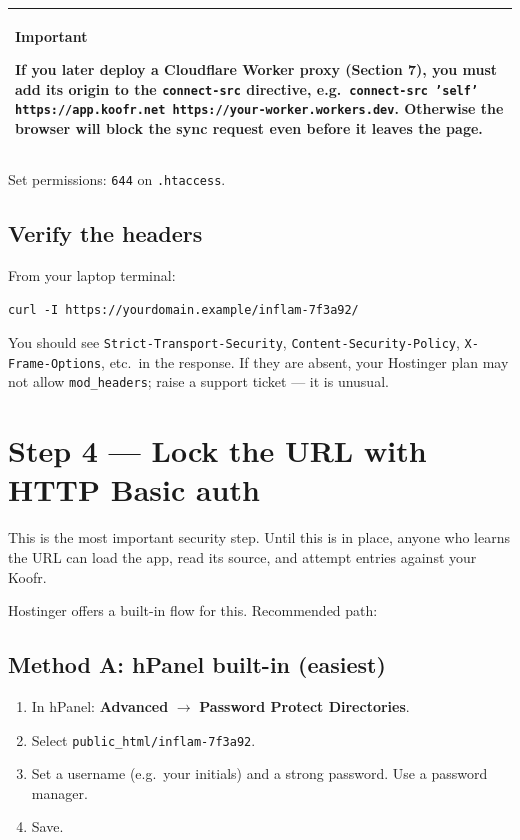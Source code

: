 \documentclass[11pt,a4paper]{article}
\newcommand{\callout}[3]{%
  \begin{center}%
  \begin{tabularx}{\linewidth}{|>{\columncolor{#1}}X|}%
  \hline
  \textbf{#2}\par\smallskip #3\\[2pt]
  \hline
  \end{tabularx}%
  \end{center}%
}
\newcommand{\warnbox}[1]{\callout{warnbg}{Important}{#1}}
\begin{document}
\warnbox{If you later deploy a Cloudflare Worker proxy (Section 7), you must add its origin to the \texttt{connect-src} directive, e.g.\ \texttt{connect-src 'self' https://app.koofr.net https://your-worker.workers.dev}. Otherwise the browser will block the sync request even before it leaves the page.}

Set permissions: \texttt{644} on \texttt{.htaccess}.

\subsection*{Verify the headers}

From your laptop terminal:

\begin{lstlisting}[language=shell]
curl -I https://yourdomain.example/inflam-7f3a92/
\end{lstlisting}

You should see \texttt{Strict-Transport-Security}, \texttt{Content-Security-Policy}, \texttt{X-Frame-Options}, etc.\ in the response. If they are absent, your Hostinger plan may not allow \texttt{mod\_headers}; raise a support ticket --- it is unusual.

\section{Step 4 --- Lock the URL with HTTP Basic auth}

This is the most important security step. Until this is in place, anyone who learns the URL can load the app, read its source, and attempt entries against your Koofr.

Hostinger offers a built-in flow for this. Recommended path:

\subsection{Method A: hPanel built-in (easiest)}

\begin{enumerate}[leftmargin=*]
  \item In hPanel: \textbf{Advanced} $\rightarrow$ \textbf{Password Protect Directories}.
  \item Select \texttt{public\_html/inflam-7f3a92}.
  \item Set a username (e.g.\ your initials) and a strong password. Use a password manager.
  \item Save.
\end{enumerate}
\end{document}
